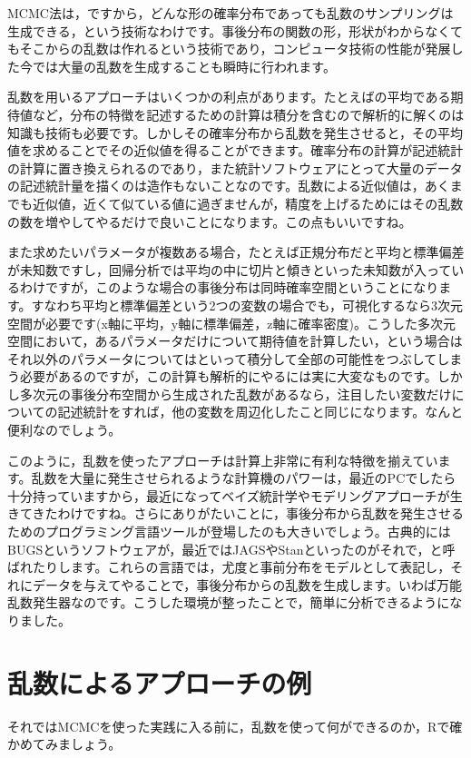 \documentclass{ltjsbook}
\begin{document}
MCMC法は，ですから，どんな形の確率分布であっても乱数のサンプリングは生成できる，という技術なわけです。事後分布の関数の形，形状がわからなくてもそこからの乱数は作れるという技術であり，コンピュータ技術の性能が発展した今では大量の乱数を生成することも瞬時に行われます。

乱数を用いるアプローチはいくつかの利点があります。たとえばの平均である期待値など，分布の特徴を記述するための計算は積分を含むので解析的に解くのは知識も技術も必要です。しかしその確率分布から乱数を発生させると，その平均値を求めることでその近似値を得ることができます。確率分布の計算が記述統計の計算に置き換えられるのであり，また統計ソフトウェアにとって大量のデータの記述統計量を描くのは造作もないことなのです。乱数による近似値は，あくまでも近似値，近くて似ている値に過ぎませんが，精度を上げるためにはその乱数の数を増やしてやるだけで良いことになります。この点もいいですね。

また求めたいパラメータが複数ある場合，たとえば正規分布だと平均と標準偏差が未知数ですし，回帰分析では平均の中に切片と傾きといった未知数が入っているわけですが，このような場合の事後分布は同時確率空間ということになります。すなわち平均と標準偏差という2つの変数の場合でも，可視化するなら3次元空間が必要です(x軸に平均，y軸に標準偏差，z軸に確率密度)。こうした多次元空間において，あるパラメータだけについて期待値を計算したい，という場合はそれ以外のパラメータについてはといって積分して全部の可能性をつぶしてしまう必要があるのですが，この計算も解析的にやるには実に大変なものです。しかし多次元の事後分布空間から生成された乱数があるなら，注目したい変数だけについての記述統計をすれば，他の変数を周辺化したこと同じになります。なんと便利なのでしょう。

このように，乱数を使ったアプローチは計算上非常に有利な特徴を揃えています。乱数を大量に発生させられるような計算機のパワーは，最近のPCでしたら十分持っていますから，最近になってベイズ統計学やモデリングアプローチが生きてきたわけですね。さらにありがたいことに，事後分布から乱数を発生させるためのプログラミング言語ツールが登場したのも大きいでしょう。古典的にはBUGSというソフトウェアが，最近ではJAGSやStanといったのがそれで，と呼ばれたりします。これらの言語では，尤度と事前分布をモデルとして表記し，それにデータを与えてやることで，事後分布からの乱数を生成します。いわば万能乱数発生器なのです。こうした環境が整ったことで，簡単に分析できるようになりました。

\section{乱数によるアプローチの例}
それではMCMCを使った実践に入る前に，乱数を使って何ができるのか，Rで確かめてみましょう。
\end{document}
